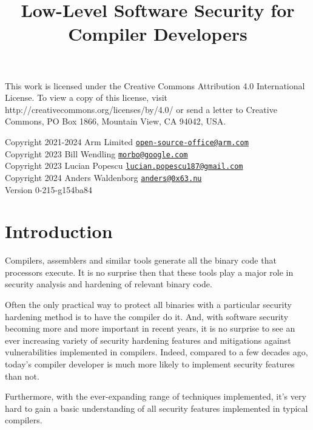 \documentclass[
  a4paper,
]{report}
\title{Low-Level Software Security for Compiler Developers}
\author{}
\date{}
\begin{document}
\maketitle

\clearpage

\vspace*{\fill}
This work is licensed under the Creative Commons Attribution 4.0 International
License. To view a copy of this license, visit
http://creativecommons.org/licenses/by/4.0/ or send a letter to Creative
Commons, PO Box 1866, Mountain View, CA 94042, USA.

  Copyright 2021-2024 Arm Limited
\href{mailto:open-source-office@arm.com}{\nolinkurl{open-source-office@arm.com}}\\
  Copyright 2023 Bill Wendling
\href{mailto:morbo@google.com}{\nolinkurl{morbo@google.com}}\\
  Copyright 2023 Lucian Popescu
\href{mailto:lucian.popescu187@gmail.com}{\nolinkurl{lucian.popescu187@gmail.com}}\\
  Copyright 2024 Anders Waldenborg
\href{mailto:anders@0x63.nu}{\nolinkurl{anders@0x63.nu}}\\

Version 0-215-g154ba84
\clearpage

{
\hypersetup{linkcolor=}
\setcounter{tocdepth}{2}
\tableofcontents
}
\chapter{Introduction}\label{introduction}

Compilers, assemblers and similar tools generate all the binary code
that processors execute. It is no surprise then that these tools play a
major role in security analysis and hardening of relevant binary code.

Often the only practical way to protect all binaries with a particular
security hardening method is to have the compiler do it. And, with
software security becoming more and more important in recent years, it
is no surprise to see an ever increasing variety of security hardening
features and mitigations against vulnerabilities implemented in
compilers. Indeed, compared to a few decades ago, today's compiler
developer is much more likely to implement security features than not.

Furthermore, with the ever-expanding range of techniques implemented,
it's very hard to gain a basic understanding of all security features
implemented in typical compilers.
\end{document}
